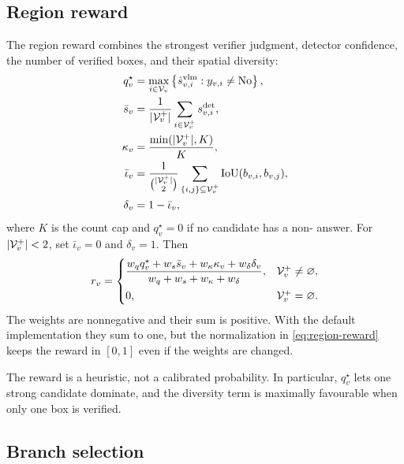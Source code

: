 \subsection{Region reward}

The region reward combines the strongest verifier judgment, detector confidence,
the number of verified boxes, and their spatial diversity:
\begin{align}
  q^{\star}_v
  &= \max_{i \in \mathcal{V}_v}
     \left\{
       \hat{s}^{\mathrm{vlm}}_{v,i}
       : y_{v,i} \ne \text{No}
     \right\}, \\
  \bar{s}_v
  &= \frac{1}{|\mathcal{V}^{+}_v|}
     \sum_{i \in \mathcal{V}^{+}_v} s^{\mathrm{det}}_{v,i}, \\
  \kappa_v
  &= \frac{\min(|\mathcal{V}^{+}_v|, K)}{K}, \\
  \bar{\iota}_v
  &= \frac{1}{\binom{|\mathcal{V}^{+}_v|}{2}}
     \sum_{\{i,j\}\subseteq \mathcal{V}^{+}_v}
     \operatorname{IoU}(b_{v,i}, b_{v,j}), \\
  \delta_v
  &= 1 - \bar{\iota}_v,
\end{align}
where \(K\) is the count cap and \(q^{\star}_v=0\) if no candidate has a
non- answer. For \(|\mathcal{V}^{+}_v|<2\), set \(\bar{\iota}_v=0\) and
\(\delta_v=1\). Then
\begin{equation}
  r_v =
  \begin{cases}
    \displaystyle
    \frac{
      w_q q^{\star}_v
      + w_s \bar{s}_v
      + w_\kappa \kappa_v
      + w_\delta \delta_v
    }{
      w_q + w_s + w_\kappa + w_\delta
    }, & \mathcal{V}^{+}_v \ne \varnothing, \\[8pt]
    0, & \mathcal{V}^{+}_v = \varnothing.
  \end{cases}
  \label{eq:region-reward}
\end{equation}
The weights are nonnegative and their sum is positive. With the default
implementation they sum to one, but the normalization in
\eqref{eq:region-reward} keeps the reward in \([0,1]\) even if the weights are
changed.

The reward is a heuristic, not a calibrated probability. In particular,
\(q^{\star}_v\) lets one strong candidate dominate, and the diversity term is
maximally favourable when only one box is verified.

\subsection{Branch selection}

